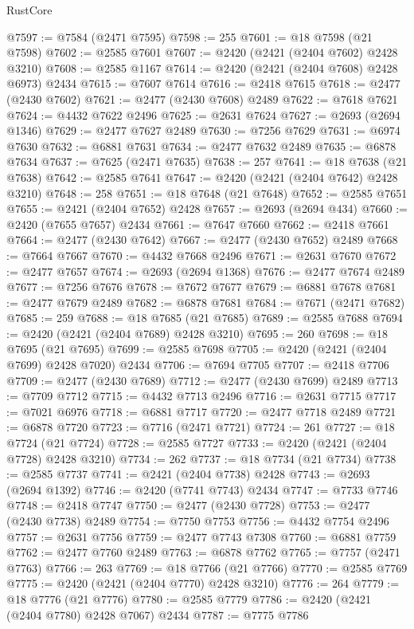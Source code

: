 \begin{lexlean}{RustCore}
\begin{coremodule}
@7597 := @7584 (@2471 @7595)
@7598 := 255
@7601 := @18 @7598 (@21 @7598)
@7602 := @2585 @7601
@7607 := @2420 (@2421 (@2404 @7602) @2428 @3210)
@7608 := @2585 @1167
@7614 := @2420 (@2421 (@2404 @7608) @2428 @6973) @2434
@7615 := @7607 @7614
@7616 := @2418 @7615
@7618 := @2477 (@2430 @7602)
@7621 := @2477 (@2430 @7608) @2489
@7622 := @7618 @7621
@7624 := @4432 @7622 @2496
@7625 := @2631 @7624
@7627 := @2693 (@2694 @1346)
@7629 := @2477 @7627 @2489
@7630 := @7256 @7629
@7631 := @6974 @7630
@7632 := @6881 @7631
@7634 := @2477 @7632 @2489
@7635 := @6878 @7634
@7637 := @7625 (@2471 @7635)
@7638 := 257
@7641 := @18 @7638 (@21 @7638)
@7642 := @2585 @7641
@7647 := @2420 (@2421 (@2404 @7642) @2428 @3210)
@7648 := 258
@7651 := @18 @7648 (@21 @7648)
@7652 := @2585 @7651
@7655 := @2421 (@2404 @7652) @2428
@7657 := @2693 (@2694 @434)
@7660 := @2420 (@7655 @7657) @2434
@7661 := @7647 @7660
@7662 := @2418 @7661
@7664 := @2477 (@2430 @7642)
@7667 := @2477 (@2430 @7652) @2489
@7668 := @7664 @7667
@7670 := @4432 @7668 @2496
@7671 := @2631 @7670
@7672 := @2477 @7657
@7674 := @2693 (@2694 @1368)
@7676 := @2477 @7674 @2489
@7677 := @7256 @7676
@7678 := @7672 @7677
@7679 := @6881 @7678
@7681 := @2477 @7679 @2489
@7682 := @6878 @7681
@7684 := @7671 (@2471 @7682)
@7685 := 259
@7688 := @18 @7685 (@21 @7685)
@7689 := @2585 @7688
@7694 := @2420 (@2421 (@2404 @7689) @2428 @3210)
@7695 := 260
@7698 := @18 @7695 (@21 @7695)
@7699 := @2585 @7698
@7705 := @2420 (@2421 (@2404 @7699) @2428 @7020) @2434
@7706 := @7694 @7705
@7707 := @2418 @7706
@7709 := @2477 (@2430 @7689)
@7712 := @2477 (@2430 @7699) @2489
@7713 := @7709 @7712
@7715 := @4432 @7713 @2496
@7716 := @2631 @7715
@7717 := @7021 @6976
@7718 := @6881 @7717
@7720 := @2477 @7718 @2489
@7721 := @6878 @7720
@7723 := @7716 (@2471 @7721)
@7724 := 261
@7727 := @18 @7724 (@21 @7724)
@7728 := @2585 @7727
@7733 := @2420 (@2421 (@2404 @7728) @2428 @3210)
@7734 := 262
@7737 := @18 @7734 (@21 @7734)
@7738 := @2585 @7737
@7741 := @2421 (@2404 @7738) @2428
@7743 := @2693 (@2694 @1392)
@7746 := @2420 (@7741 @7743) @2434
@7747 := @7733 @7746
@7748 := @2418 @7747
@7750 := @2477 (@2430 @7728)
@7753 := @2477 (@2430 @7738) @2489
@7754 := @7750 @7753
@7756 := @4432 @7754 @2496
@7757 := @2631 @7756
@7759 := @2477 @7743 @7308
@7760 := @6881 @7759
@7762 := @2477 @7760 @2489
@7763 := @6878 @7762
@7765 := @7757 (@2471 @7763)
@7766 := 263
@7769 := @18 @7766 (@21 @7766)
@7770 := @2585 @7769
@7775 := @2420 (@2421 (@2404 @7770) @2428 @3210)
@7776 := 264
@7779 := @18 @7776 (@21 @7776)
@7780 := @2585 @7779
@7786 := @2420 (@2421 (@2404 @7780) @2428 @7067) @2434
@7787 := @7775 @7786

\end{coremodule}
\end{lexlean}

